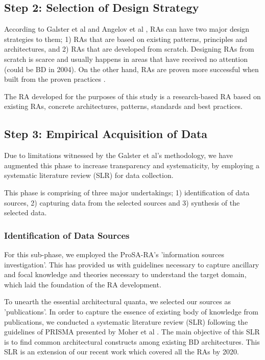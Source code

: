 \documentclass[runningheads]{llncs}
\begin{document}
\subsection{Step 2: Selection of Design Strategy}
According to Galster et al \cite{GALSTER} and Angelov et al \cite{angelov2008towards}, RAs can have two major design strategies to them; 1) RAs that are based on existing patterns, principles and architectures, and 2) RAs that are developed from scratch. Designing RAs from scratch is scarce and usually happens in areas that have received no attention (could be BD in 2004). On the other hand, RAs are proven more successful when built from the proven practices \cite{Cloutier}. 

The RA developed for the purposes of this study is a research-based RA based on existing RAs, concrete architectures, patterns, standards and best practices.

\subsection{Step 3: Empirical Acquisition of Data}
Due to limitations witnessed by the Galster et al's methodology, we have augmented this phase to increase transparency and systematicity, by employing a systematic literature review (SLR) for data collection. 

This phase is comprising of three major undertakings; 1) identification of data sources, 2) capturing data from the selected sources and 3) synthesis of the selected data. 

\subsubsection{Identification of Data Sources\\}

For this sub-phase, we employed the ProSA-RA's 'information sources investigation'. This has provided us with guidelines necessary to capture ancillary and focal knowledge and theories necessary to understand the target domain, which laid the foundation of the RA development. 

To unearth the essential architectural quanta, we selected our sources as 'publications'. In order to capture the essence of existing body of knowledge from publications, we conducted a systematic literature review (SLR) following the guidelines of PRISMA presented by Moher et al \cite{Shamseer}. The main objective of this SLR is to find common architectural constructs among existing BD architectures. This SLR is an extension of our recent work \cite{AtaeiACIS} which covered all the RAs by 2020. 
\end{document}
